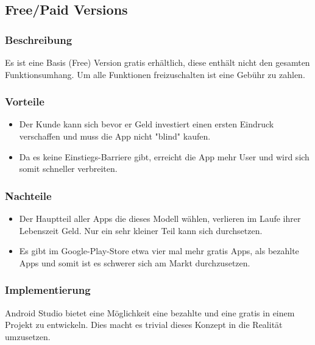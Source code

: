 \documentclass[FIPLY_base.tex]{subfiles}
\begin{document}
\subsection{Free/Paid Versions}


\subsubsection{Beschreibung}
Es ist eine Basis (Free) Version gratis erhältlich, diese enthält nicht den gesamten Funktionsumhang.
Um alle Funktionen freizuschalten ist eine Gebühr zu zahlen.

\subsubsection{Vorteile}
\begin{itemize}
\item Der Kunde kann sich bevor er Geld investiert einen ersten Eindruck verschaffen und muss die App nicht "blind" kaufen.
\item Da es keine Einstiegs-Barriere gibt, erreicht die App mehr User und wird sich somit schneller verbreiten.
\end{itemize}

\subsubsection{Nachteile}
\begin{itemize}
\item Der Hauptteil aller Apps die dieses Modell wählen, verlieren im Laufe ihrer Lebenszeit Geld. Nur ein sehr kleiner Teil kann sich durchsetzen.
\item Es gibt im Google-Play-Store etwa vier mal mehr gratis Apps, als bezahlte Apps und somit ist es schwerer sich am Markt durchzusetzen.
\end{itemize}

\subsubsection{Implementierung}

Android Studio bietet eine Möglichkeit eine bezahlte und eine gratis in einem Projekt zu entwickeln.
 Dies macht es trivial dieses Konzept in die Realität umzusetzen.
\end{document}
